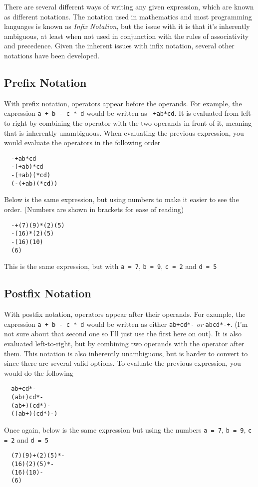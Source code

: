 There are several different ways of writing any given expression, which are known as different notations. The notation
 used in mathematics and most programming languages is known as \textit{Infix Notation}, but the issue with it is that
 it's inherently ambiguous, at least when not used in conjunction with the rules of associativity and precedence.
 Given the inherent issues with infix notation, several other notations have been developed.

\subsection*{Prefix Notation}

With prefix notation, operators appear before the operands. For example, the expression \verb`a + b - c * d` would be
 written as \verb`-+ab*cd`. It is evaluated from left-to-right by combining the operator with the two operands in front
 of it, meaning that is inherently unambiguous. When evaluating the previous expression, you would evaluate the operators
 in the following order
\begin{verbatim}
  -+ab*cd
  -(+ab)*cd
  -(+ab)(*cd)
  (-(+ab)(*cd))
\end{verbatim}
Below is the same expression, but using numbers to make it easier to see the order. (Numbers are shown in brackets for
 ease of reading)
\begin{verbatim}
  -+(7)(9)*(2)(5)
  -(16)*(2)(5)
  -(16)(10)
  (6)
\end{verbatim}
This is the same expression, but with \verb`a = 7`, \verb`b = 9`, \verb`c = 2` and \verb`d = 5`

\subsection*{Postfix Notation}

With postfix notation, operators appear after their operands. For example, the expression \verb`a + b - c * d` would be
 written as either \verb`ab+cd*-` \textit{or} \verb`abcd*-+`. (I'm not sure about that second one so I'll just use the
 first here on out). It is also evaluated left-to-right, but by combining two operands with the operator after them.
 This notation is also inherently unambiguous, but is harder to convert to since there are several valid options. To
 evaluate the previous expression, you would do the following
\begin{verbatim}
  ab+cd*-
  (ab+)cd*-
  (ab+)(cd*)-
  ((ab+)(cd*)-)
\end{verbatim}
Once again, below is the same expression but using the numbers \verb`a = 7`, \verb`b = 9`, \verb`c = 2` and \verb`d = 5`
\begin{verbatim}
  (7)(9)+(2)(5)*-
  (16)(2)(5)*-
  (16)(10)-
  (6)
\end{verbatim}

